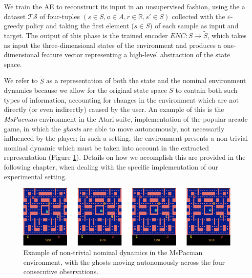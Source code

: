 We train the AE to reconstruct its input in an unsupervised fashion, using the a
dataset $\mathcal{TS}$ of four-tuples $(s \in S, a \in A, r \in \mathbb{R}, s' \in S)$ 
collected with the $\varepsilon$-greedy policy and taking the first element ($s \in S$) 
of each sample as input and target. 
The output of this phase is the trained encoder $ENC: S \rightarrow \tilde{S}$, 
which takes as input the three-dimensional states of the environment and 
produces a one-dimensional feature vector representing a high-level abstraction 
of the state space.

We refer to $\tilde{S}$ as a representation of both the state and the nominal 
environment dynamics because we allow for the original state space $S$ to 
contain both such types of information, accounting for changes in the 
environment which are not directly (or even indirectly) caused by the user. 
An example of this is the \textit{MsPacman} environment in the Atari suite, 
implementation of the popular arcade game, in which the \textit{ghosts} are able
to move autonomously, not necessarily influenced by the player; in such a 
setting, the environment presents a non-trivial nominal dynamic which must be 
taken into account in the extracted representation (Figure \ref{f:nominal_dyn}).
Details on how we accomplish this are provided in the following chapter, when 
dealing with the specific implementation of our experimental setting.
%
\begin{figure}
\includegraphics[width=\textwidth]{pictures/nominal_dyn}
\centering
\caption[Example of non-trivial nominal dynamics]{Example of non-trivial nominal
						  dynamics in the \textup{MsPacman}
						  environment, with the ghosts 
						  moving autonomously across the
						  four consecutive observations.}
\label{f:nominal_dyn}
\end{figure}
%

